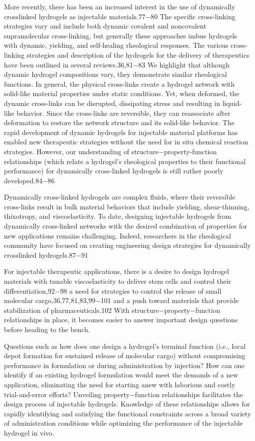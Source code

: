\documentclass[../../main-notes.tex]{subfiles}
\begin{document}
More recently, there has been an increased interest in the use of dynamically crosslinked hydrogels as injectable materials.77−80 
The specific cross-linking strategies vary and include both dynamic covalent and noncovalent supramolecular cross-linking, but generally these approaches imbue hydrogels with dynamic, yielding, and self-healing rheological responses. 
The various cross-linking strategies and description of the hydrogels for the delivery of  therapeutics have been outlined in several reviews.36,81−83 
We highlight that although dynamic hydrogel compositions vary, they demonstrate similar rheological functions. 
In general, the physical cross-links create a hydrogel network with solid-like material properties under static conditions. 
Yet, when deformed, the dynamic cross-links can be disrupted, dissipating stress and resulting in liquid-like behavior. 
Since the cross-links are reversible, they can reassociate after deformation to restore the network structure and its solid-like behavior. 
The rapid development of dynamic hydrogels for injectable material platforms has enabled new therapeutic strategies without the need for in situ chemical reaction strategies. 
However, our understanding of structure−property-function relationships (which relate a hydrogel’s rheological properties to their functional performance) for dynamically cross-linked  hydrogels is still rather poorly developed.84−86 

Dynamically cross-linked hydrogels are complex fluids, where their reversible cross-links result in bulk material behaviors that include yielding, shear-thinning, thixotropy, and viscoelasticity. 
To date, designing injectable hydrogels from dynamically cross-linked networks with the desired combination of properties for new applications remains challenging. 
Indeed, researchers in the rheological community have focused on creating engineering design strategies for dynamically crosslinked hydrogels.87−91 

For injectable therapeutic applications, there is a desire to design hydrogel materials with tunable viscoelasticity to deliver stem cells and control their differentiation,92−98 a need for strategies to control the release of  small molecular cargo,36,77,81,83,99−101 and a push toward  materials that provide stabilization of pharmaceuticals.102 
With structure−property−function relationships in place, it becomes easier to answer important design questions before heading to the bench. 

Questions such as 
how does one design a hydrogel’s terminal function (i.e., local depot formation for sustained release of molecular cargo) without compromising performance in formulation or during administration by injection? 
How can one identify if an existing hydrogel formulation would meet the demands of a new application, eliminating the need for starting anew with laborious and costly trial-and-error efforts? Unveiling property−function relationships facilitates the design process of injectable hydrogels. 
Knowledge of these relationships allows for rapidly identifying and satisfying the functional constraints across a broad variety of administration conditions while optimizing the performance of the injectable hydrogel in vivo. 
\end{document}
